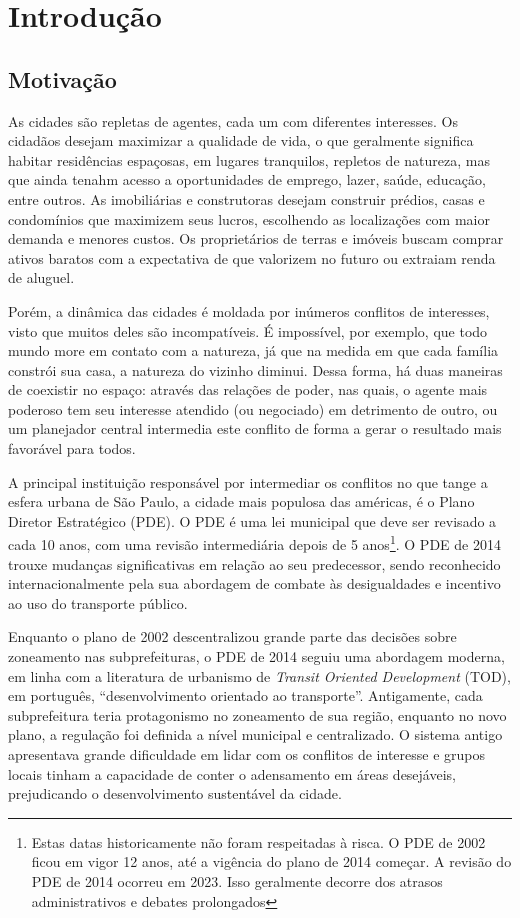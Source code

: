 \chapter{Introdução}

\section{Motivação}
\label{sec:motivacao}

As cidades são repletas de agentes, cada um com diferentes interesses. Os cidadãos desejam maximizar a qualidade de vida, o que geralmente significa habitar residências espaçosas, em lugares tranquilos, repletos de natureza, mas que ainda tenahm acesso a oportunidades de emprego, lazer, saúde, educação, entre outros. As imobiliárias e construtoras desejam construir prédios, casas e condomínios que maximizem seus lucros, escolhendo as localizações com maior demanda e menores custos. Os proprietários de terras e imóveis buscam comprar ativos baratos com a expectativa de que valorizem no futuro ou extraiam renda de aluguel. 

Porém, a dinâmica das cidades é moldada por inúmeros conflitos de interesses, visto que muitos deles são incompatíveis. É impossível, por exemplo, que todo mundo more em contato com a natureza, já que na medida em que cada família constrói sua casa, a natureza do vizinho diminui. Dessa forma, há duas maneiras de coexistir no espaço: através das relações de poder, nas quais, o agente mais poderoso tem seu interesse atendido (ou negociado) em detrimento de outro, ou um planejador central intermedia este conflito de forma a gerar o resultado mais favorável para todos.

A principal instituição responsável por intermediar os conflitos no que tange a esfera urbana de São Paulo, a cidade mais populosa das américas, é o Plano Diretor Estratégico (PDE). O PDE é uma lei municipal que deve ser revisado a cada 10 anos, com uma revisão intermediária depois de 5 anos\footnote{Estas datas historicamente não foram respeitadas à risca. O PDE de 2002 ficou em vigor 12 anos, até a vigência do plano de 2014 começar. A revisão do PDE de 2014 ocorreu em 2023. Isso geralmente decorre dos atrasos administrativos  e debates prolongados}. O PDE de 2014 trouxe mudanças significativas em relação ao seu predecessor, sendo reconhecido internacionalmente pela sua abordagem de combate às desigualdades e incentivo ao uso do transporte público.

Enquanto o plano de 2002 descentralizou grande parte das decisões sobre zoneamento nas subprefeituras, o PDE de 2014 seguiu uma abordagem moderna, em linha com a literatura de urbanismo de \textit{Transit Oriented Development} (TOD), em português, ``desenvolvimento orientado ao transporte''. Antigamente, cada subprefeitura teria protagonismo no zoneamento de sua região, enquanto no novo plano, a regulação foi definida a nível municipal e centralizado. O sistema antigo apresentava grande dificuldade em lidar com os conflitos de interesse e grupos locais tinham a capacidade de conter o adensamento em áreas desejáveis, prejudicando o desenvolvimento sustentável da cidade.

